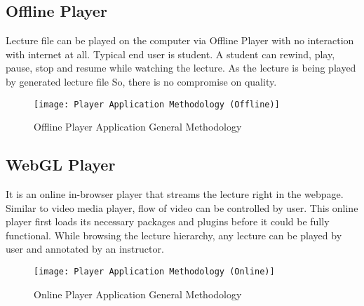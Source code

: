 \subsection{Offline Player}
Lecture file can be played on the computer via Offline Player with no interaction with internet at all. Typical end user is student. A student can rewind, play, pause, stop and resume while watching the lecture. As the lecture is being played by generated lecture file So, there is no compromise on quality.
\newpage
\begin{figure}[h]
  \centering
  \texttt{[image: Player Application Methodology (Offline)]}
  \caption{Offline Player Application General Methodology}
\end{figure}

\subsection{WebGL Player}
It is an online in-browser player that streams the lecture right in the webpage. Similar to video media player, flow of video can be controlled by user. This online player first loads its necessary packages and plugins before it could be fully functional. While browsing the lecture hierarchy, any lecture can be played by user and annotated by an instructor.

\begin{figure}[h]
  \centering
  \texttt{[image: Player Application Methodology (Online)]}
  \caption{Online Player Application General Methodology}
\end{figure}

\newpage
